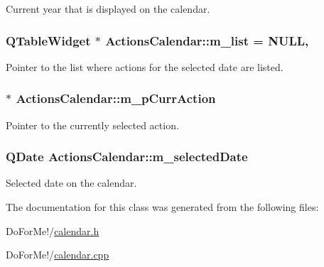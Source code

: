 Current year that is displayed on the calendar. 

\hypertarget{class_actions_calendar_a42812597a2424012a160e7755754effa}{
\subsubsection[{m\-\_\-list}]{\setlength{\rightskip}{0pt plus 5cm}Q\-Table\-Widget $\ast$ Actions\-Calendar\-::m\-\_\-list = N\-U\-L\-L\hspace{0.3cm}{\ttfamily [static]}, {\ttfamily [private]}}}\label{class_actions_calendar_a42812597a2424012a160e7755754effa}


Pointer to the list where actions for the selected date are listed. 

\hypertarget{class_actions_calendar_a5734f7c421b4e06e4f7b5fe29c9707e3}{
\subsubsection[{m\-\_\-p\-Curr\-Action}]{$\ast$ Actions\-Calendar\-::m\-\_\-p\-Curr\-Action\hspace{0.3cm}{\ttfamily [private]}}}\label{class_actions_calendar_a5734f7c421b4e06e4f7b5fe29c9707e3}


Pointer to the currently selected action. 

\hypertarget{class_actions_calendar_a27243b1e4fc38882d61edbba4144d6ba}{
\subsubsection[{m\-\_\-selected\-Date}]{\setlength{\rightskip}{0pt plus 5cm}Q\-Date Actions\-Calendar\-::m\-\_\-selected\-Date\hspace{0.3cm}{\ttfamily [private]}}}\label{class_actions_calendar_a27243b1e4fc38882d61edbba4144d6ba}


Selected date on the calendar. 



The documentation for this class was generated from the following files\-:\begin{DoxyCompactItemize}
\item 
Do\-For\-Me!/\hyperlink{calendar_8h}{calendar.\-h}\item 
Do\-For\-Me!/\hyperlink{calendar_8cpp}{calendar.\-cpp}\end{DoxyCompactItemize}
